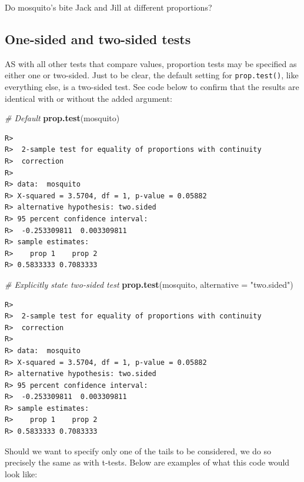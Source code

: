 \documentclass[english,10pt,a4paper,oneside]{book}
\newenvironment{Shaded}{\begin{snugshade}}{\end{snugshade}}
\newcommand{\KeywordTok}[1]{\textcolor[rgb]{0.13,0.29,0.53}{\textbf{#1}}}
\newcommand{\DataTypeTok}[1]{\textcolor[rgb]{0.13,0.29,0.53}{#1}}
\newcommand{\StringTok}[1]{\textcolor[rgb]{0.31,0.60,0.02}{#1}}
\newcommand{\CommentTok}[1]{\textcolor[rgb]{0.56,0.35,0.01}{\textit{#1}}}
\newcommand{\NormalTok}[1]{#1}
\theoremstyle{definition}
\theoremstyle{definition}
\theoremstyle{definition}
\theoremstyle{remark}
\begin{document}
Do mosquito's bite Jack and Jill at different proportions?

\subsection{One-sided and two-sided
tests}\label{one-sided-and-two-sided-tests}

AS with all other tests that compare values, proportion tests may be
specified as either one or two-sided. Just to be clear, the default
setting for \texttt{prop.test()}, like everything else, is a two-sided
test. See code below to confirm that the results are identical with or
without the added argument:

\begin{Shaded}
\begin{Highlighting}[]
\CommentTok{# Default}
\KeywordTok{prop.test}\NormalTok{(mosquito)}
\end{Highlighting}
\end{Shaded}

\begin{verbatim}
R> 
R>  2-sample test for equality of proportions with continuity
R>  correction
R> 
R> data:  mosquito
R> X-squared = 3.5704, df = 1, p-value = 0.05882
R> alternative hypothesis: two.sided
R> 95 percent confidence interval:
R>  -0.253309811  0.003309811
R> sample estimates:
R>    prop 1    prop 2 
R> 0.5833333 0.7083333
\end{verbatim}

\begin{Shaded}
\begin{Highlighting}[]
\CommentTok{# Explicitly state two-sided test}
\KeywordTok{prop.test}\NormalTok{(mosquito, }\DataTypeTok{alternative =} \StringTok{"two.sided"}\NormalTok{)}
\end{Highlighting}
\end{Shaded}

\begin{verbatim}
R> 
R>  2-sample test for equality of proportions with continuity
R>  correction
R> 
R> data:  mosquito
R> X-squared = 3.5704, df = 1, p-value = 0.05882
R> alternative hypothesis: two.sided
R> 95 percent confidence interval:
R>  -0.253309811  0.003309811
R> sample estimates:
R>    prop 1    prop 2 
R> 0.5833333 0.7083333
\end{verbatim}

Should we want to specify only one of the tails to be considered, we do
so precisely the same as with t-tests. Below are examples of what this
code would look like:
\end{document}
